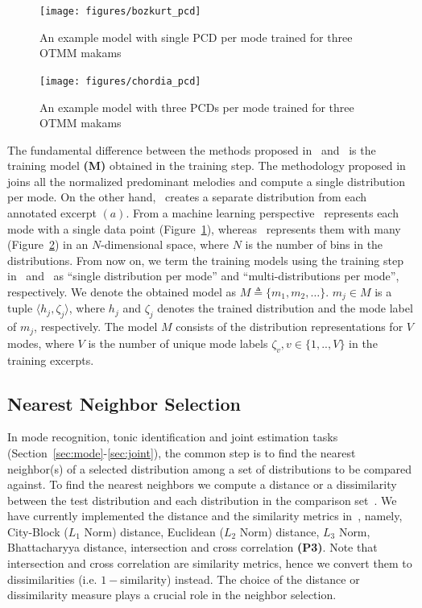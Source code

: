 \documentclass{sig-alternate}
\begin{document}
\begin{figure}
\centering
\texttt{[image: figures/bozkurt\_pcd]}
\caption{An example model with single PCD per mode trained for three OTMM makams}
\label{fig:bozkurt_training}
\end{figure}

\begin{figure}
\centering
\texttt{[image: figures/chordia\_pcd]}
\caption{An example model with three PCDs per mode trained for three OTMM makams}
\label{fig:chordia_training}
\end{figure}

The fundamental difference between the methods proposed in~\cite{chordia} and~\cite{bozkurt_makam} is the training model {\bf (M)} obtained in the training step. The methodology proposed in~\cite{bozkurt_tonic, bozkurt_makam} joins all the normalized predominant melodies and compute a single distribution per mode. On the other hand,~\cite{chordia} creates a separate distribution from each annotated excerpt $(a)$. From a machine learning perspective~\cite{bozkurt_makam} represents each mode with a single data point (Figure~\ref{fig:bozkurt_training}), whereas~\cite{chordia} represents them with many (Figure~\ref{fig:chordia_training}) in an $N$-dimensional space, where $N$ is the number of bins in the distributions. From now on, we term the training models using the training step in~\cite{bozkurt_tonic, bozkurt_makam} and~\cite{chordia} as ``single distribution per mode'' and ``multi-distributions per mode'', respectively. We denote the obtained model as $M \triangleq \{m_1, m_2, \dots\}$. $m_j \in M$ is a tuple $\langle h_j, \zeta_j\rangle$, where $h_j$ and $\zeta_j$ denotes the trained distribution and the mode label of $m_j$, respectively. The model $M$ consists of the distribution representations for $V$ modes, where $V$ is the number of unique mode labels $\zeta_v, v \in \{1,..,V\}$ in the training excerpts.

\subsection{Nearest Neighbor Selection}\label{sec:distance}
In mode recognition, tonic identification and joint estimation tasks (Section~\ref{sec:mode}-\ref{sec:joint}), the common step is to find the nearest neighbor(s) of a selected distribution among a set of distributions to be compared against. To find the nearest neighbors we compute a distance or a dissimilarity between the test distribution and each distribution in the comparison set~\cite{distance}. We have currently implemented the distance and the similarity metrics in~\cite{bozkurt_makam, chordia}, namely, City-Block ($L_1$ Norm) distance, Euclidean ($L_2$ Norm) distance, $L_3$ Norm, Bhattacharyya distance, intersection and cross correlation {\bf (P3)}. Note that intersection and cross correlation are similarity metrics, hence we convert them to dissimilarities (i.e. $1 - $similarity) instead. The choice of the distance or dissimilarity measure plays a crucial role in the neighbor selection.
\end{document}
